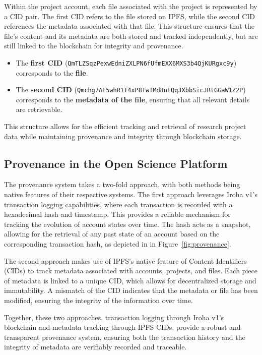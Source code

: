 \documentclass[final]{rc-book-2.14}
\begin{document}
Within the project account, each file associated with the project is represented by a CID pair. The first CID refers to the file stored on IPFS, while the second CID references the metadata associated with that file. This structure ensures that the file's content and its metadata are both stored and tracked independently, but are still linked to the blockchain for integrity and provenance.

\begin{itemize}
    \item The \textbf{first CID} (\texttt{QmTLZSqzPexwEdniZXLPN6fUfmEXX6MXS3b4QjKURgxc9y}) corresponds to the \textbf{file}.
    \item The \textbf{second CID} (\texttt{Qmchg7At5whR1T4xP8TwTMd8ntQqJXbbSicJRtGGaW1Z2P}) corresponds to the \textbf{metadata of the file}, ensuring that all relevant details are retrievable.
\end{itemize}

This structure allows for the efficient tracking and retrieval of research project data while maintaining provenance and integrity through blockchain storage.

\subsection{Provenance in the Open Science Platform}

The provenance system takes a two-fold approach, with both methods being native features of their respective systems. The first approach leverages Iroha v1’s transaction logging capabilities, where each transaction is recorded with a hexadecimal hash and timestamp. This provides a reliable mechanism for tracking the evolution of account states over time. The hash acts as a snapshot, allowing for the retrieval of any past state of an account based on the corresponding transaction hash, as depicted in in Figure~\ref{fig:provenance}.

The second approach makes use of IPFS’s native feature of Content Identifiers (CIDs) to track metadata associated with accounts, projects, and files. Each piece of metadata is linked to a unique CID, which allows for decentralized storage and immutability. A mismatch of the CID indicates that the metadata or file has been modified, ensuring the integrity of the information over time.

Together, these two approaches, transaction logging through Iroha v1’s blockchain and metadata tracking through IPFS CIDs, provide a robust and transparent provenance system, ensuring both the transaction history and the integrity of metadata are verifiably recorded and traceable.
\end{document}
